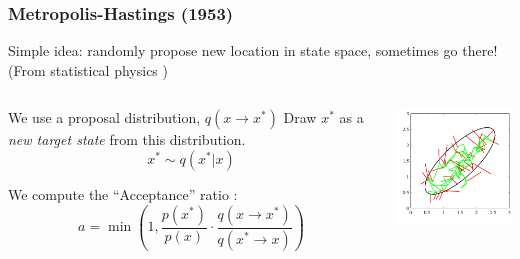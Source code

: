 \documentclass[compress]{beamer}
\begin{document}
\begin{frame}
  \frametitle{Metropolis-Hastings (1953) }
  Simple idea: randomly propose new location in state space, 
    sometimes go there! (From statistical physics   \cite{Metropolis_Equation_1953})
  \begin{columns}
    \begin{column}{5cm}
      
      We use a proposal distribution, $q(x \rightarrow x^\ast)$ 
      Draw $x^\ast$ as a \textit{new target state} from this distribution. 
      \begin{equation*}
        x^\ast  \sim q(x^\ast | x)
      \end{equation*}
      
      We compute the ``Acceptance'' ratio :       
      \begin{equation*}
        a = \min (1, \frac{p(x^\ast)}{p(x)} \cdot 
        \frac{q(x \rightarrow x^\ast)}{q(x^\ast \rightarrow x)})
      \end{equation*}
    \end{column}

  \begin{column}{5cm}
    \includegraphics[width=5cm]{notmine/Bishop_Figure11-9}
    \end{column}
  \end{columns}

\end{frame}
\end{document}
